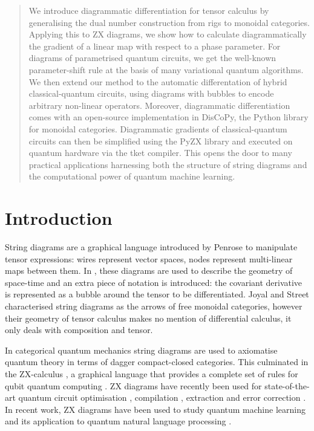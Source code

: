 
\begin{abstract}
We introduce diagrammatic differentiation for tensor calculus by generalising the
dual number construction from rigs to monoidal categories. Applying this to ZX
diagrams, we show how to calculate diagrammatically the gradient of a linear map
with respect to a phase parameter. For diagrams of parametrised quantum circuits,
we get the well-known parameter-shift rule at the basis of many variational
quantum algorithms. We then extend our method to the automatic
differentation of hybrid classical-quantum circuits, using diagrams with bubbles
to encode arbitrary non-linear operators. Moreover, diagrammatic differentiation
comes with an open-source implementation in DisCoPy, the Python library for
monoidal categories.
Diagrammatic gradients of classical-quantum circuits can then be simplified
using the PyZX library and executed on quantum hardware via the
tket compiler. This opens the door to many practical applications
harnessing both the structure of string diagrams and the computational power of
quantum machine learning.
\end{abstract}

\section*{Introduction}

String diagrams are a graphical language introduced by Penrose \cite{Penrose71}
to manipulate tensor expressions: wires represent vector spaces, nodes represent
multi-linear maps between them. In \cite{PenroseRindler84}, these diagrams are
used to describe the geometry of space-time and an extra piece of notation is
introduced: the covariant derivative is represented as a bubble around the tensor
to be differentiated. Joyal and Street \cite{JoyalStreet88,JoyalStreet91}
characterised string diagrams as the arrows of free monoidal categories, however
their geometry of tensor calculus makes no mention of differential calculus, it
only deals with composition and tensor.

In categorical quantum mechanics \cite{AbramskyCoecke08} string diagrams
are used to axiomatise quantum theory in terms of dagger compact-closed
categories. This culminated in the ZX-calculus \cite{CoeckeDuncan08},
a graphical language that provides a complete set of rules for qubit quantum
computing \cite{JeandelEtAl18a,HadzihasanovicEtAl18}. ZX diagrams
have recently been used for state-of-the-art quantum circuit optimisation
\cite{KissingerVanDeWetering20,DuncanEtAl20,DeBeaudrapEtAl20}, compilation
\cite{CowtanEtAl20,DeGriendDuncan20}, extraction \cite{BackensEtAl20} and error
correction \cite{ChancellorEtAl18,GidneyFowler19}. In recent work, ZX diagrams
have been used to study quantum machine learning \cite{Yeung20,ZhaoGao21} and
its application to quantum natural language processing
\cite{MeichanetzidisEtAl20a,CoeckeEtAl20}.

